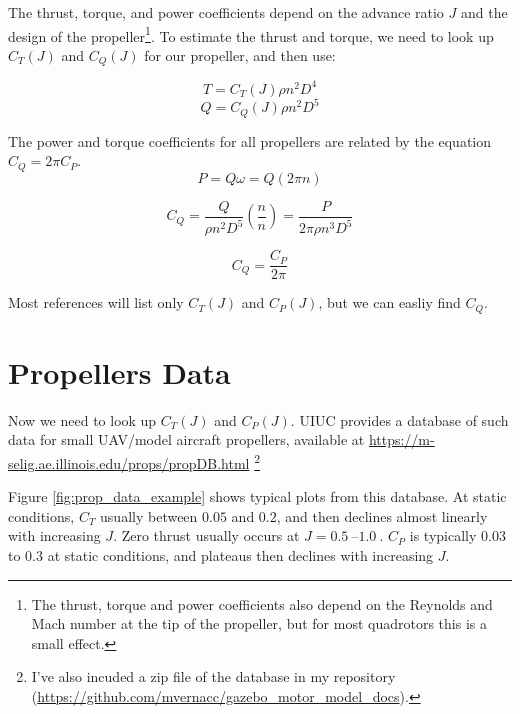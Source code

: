 \documentclass[12pt]{article}
\begin{document}
The thrust, torque, and power coefficients depend on the advance ratio $J$ and the design of the propeller\footnote{The thrust, torque and power coefficients also depend on the Reynolds and Mach number at the tip of the propeller, but for most quadrotors this is a small effect.}. To estimate the thrust and torque, we need to look up $C_T(J)$ and $C_Q(J)$ for our propeller, and then use:

\begin{equation}
    T = C_T(J) \rho n^2 D^4
\end{equation}
\begin{equation}
    Q = C_Q(J) \rho n^2 D^5
\end{equation}


The power and torque coefficients for all propellers are related by the equation $C_Q = 2 \pi C_P$. 
\[
P = Q \omega = Q (2 \pi n)
\]

\[
C_Q = \frac{Q}{\rho n^2 D^5} \left( \frac{n}{n} \right) = \frac{P}{2 \pi \rho n^3 D^5}
\]

\begin{equation}
C_Q =  \frac{C_P}{2 \pi}
\end{equation}

Most references will list only $C_T(J)$ and $C_P(J)$, but we can easliy find $C_Q$.


\section{Propellers Data}

Now we need to look up $C_T(J)$ and $C_P(J)$. UIUC provides a database of such data for small UAV/model aircraft propellers, available at \url{https://m-selig.ae.illinois.edu/props/propDB.html} \footnote{I've also incuded a zip file of the database in my repository (\url{https://github.com/mvernacc/gazebo_motor_model_docs}).}

Figure \ref{fig:prop_data_example} shows typical plots from this database. At static conditions, $C_T$ usually between $0.05$ and $0.2$, and then declines almost linearly with increasing $J$. Zero thrust usually occurs at $J = \SIrange{0.5}{1.0}{}$. $C_P$ is typically $0.03$ to $0.3$ at static conditions, and plateaus then declines with increasing $J$.
\end{document}
